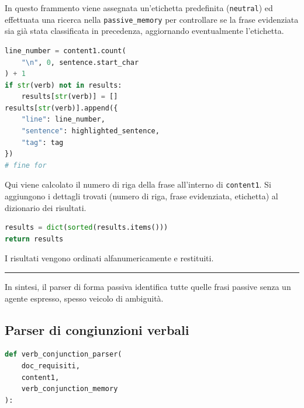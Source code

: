 \documentclass[12pt]{report}
\begin{document}
\noindent In questo frammento viene assegnata un'etichetta predefinita (\texttt{neutral}) ed effettuata una ricerca nella \texttt{passive\_memory} per controllare se la frase evidenziata sia già stata classificata in precedenza, aggiornando eventualmente l'etichetta.


\begin{mdframed}
\small
\begin{lstlisting}[language=Python]
line_number = content1.count(
    "\n", 0, sentence.start_char
) + 1
if str(verb) not in results:
    results[str(verb)] = []
results[str(verb)].append({
    "line": line_number,
    "sentence": highlighted_sentence,
    "tag": tag
})
# fine for
\end{lstlisting}
\end{mdframed}

\noindent Qui viene calcolato il numero di riga della frase all'interno di \texttt{content1}. Si aggiungono i dettagli trovati (numero di riga, frase evidenziata, etichetta) al dizionario dei risultati.


\begin{mdframed}
\small
\begin{lstlisting}[language=Python]
results = dict(sorted(results.items()))
return results
\end{lstlisting}
\end{mdframed}

\noindent I risultati vengono ordinati alfanumericamente e restituiti.

{\centering \rule{0.5\linewidth}{0.1pt} \par\vspace{0.25cm}}

In sintesi, il \textsf{parser di forma passiva} identifica tutte quelle frasi passive senza un agente espresso, spesso veicolo di ambiguità.


\subsection{Parser di congiunzioni verbali}
\label{subsec:parser_congiunzioni_verbali}

\begin{mdframed}
\small
\begin{lstlisting}[language=Python]
def verb_conjunction_parser(
    doc_requisiti,
    content1,
    verb_conjunction_memory
):
\end{lstlisting}
\end{mdframed}
\end{document}
